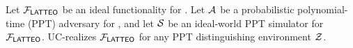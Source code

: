 \begin{theorem}
\label{thm:uc}
 Let $\mathcal{F}_{\mathsf{LATTEO}}$ %
 be an ideal functionality for \sysname. Let $\mathcal{A}$ be a probabilistic polynomial-time (PPT) adversary for \sysname, and let $\mathcal{S}$ be an ideal-world PPT simulator for $\mathcal{F}_{\mathsf{LATTEO}}$. %
 \sysname UC-realizes $\mathcal{F}_{\mathsf{LATTEO}}$ for any PPT distinguishing environment $\mathcal{Z}$.
\end{theorem}
